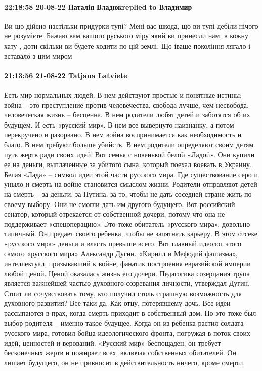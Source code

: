  
 
 
 
 

\paragraph{22:18:58 20-08-22 Наталія Владюкreplied to Владимир}

Ви що дійсно настільки придурки тупі? Мені вас шкода, що ви тупі дебіли нічого
не розумієте. Бажаю вам вашого руського міру який ви принесли нам, в кожну хату
, доти скільки ви будете ходити по цій землі. Що іваше покоління лягало і
вставало з цим миром

\paragraph{21:13:56 21-08-22 Tatjana Latviete}

Есть мир нормальных людей. В нем действуют простые и понятные истины: война – это преступление против человечества, свобода лучше, чем несвобода, человеческая жизнь – бесценна. В нем родители любят детей и заботятся об их будущем. И есть «русский мир». В нем все вывернуто наизнанку, а потом перекручено и разорвано. В нем война воспринимается как необходимость и благо. В нем требуют больше убийств. В нем родители определяют своим детям путь жертв ради своих идей.
Вот семья с новенькой белой «Ладой». Они купили ее на деньги, выплаченные за убитого сына, который поехал воевать в Украину. Белая «Лада» – символ идеи этой части русского мира. Где существование серо и уныло и смерть на войне становится смыслом жизни. Родители отправляют детей на смерть – за деньги, за Путина, за то, чтобы не дать соседней стране жить по своему выбору. Они не смогли дать им другого будущего.
Вот российский сенатор, который отрекается от собственной дочери, потому что она не поддерживает «спецоперацию». Это тоже обитатель «русского мира», довольно типичный. Он предает своего ребенка, чтобы не запятнать карьеру. В этом отсеке «русского мира» деньги и власть превыше всего.
Вот главный идеолог этого самого «русского мира» Александр Дугин. «Кирилл и Мефодий фашизма», интеллектуал, призывавший к войне, фанатик построения евразийской империи любой ценой. Ценой оказалась жизнь его дочери. Педагогика созерцания трупа является важнейшей частью духовного созревания личности, утверждал Дугин. Стоит ли сочувствовать тому, кто получил столь страшную возможность для духовного развития? Все-таки да. Как отцу, потерявшему дочь. Все идеи рассыпаются в прах, когда смерть приходит в собственный дом. Но это тоже был выбор родителя – именно такое будущее. Когда он из ребенка растил солдата русского мира, готовил бойца идеологического фронта, погружая в поток своих идей, ценностей и верований.
«Русский мир» беспощаден, он требует бесконечных жертв и пожирает всех, включая собственных обитателей. Он лишает будущего, он не привносит в действительность ничего, кроме смерти.
